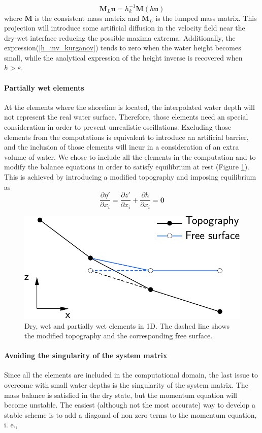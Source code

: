 \documentclass[a4paper,12pt]{elsarticle}
\newcommand{\pder}[2]{\frac{\partial#1}{\partial#2}}
\begin{document}
\begin{equation}
\mathbf{M}_L \mathbf{u} = h^{-1}_k \mathbf{M} (h\mathbf{u})
\end{equation}
where $\mathbf{M}$ is the consistent mass matrix and $\mathbf{M}_L$ is the lumped mass matrix. This projection will introduce some artificial diffusion in the velocity field near the dry-wet interface reducing the possible maxima extrema.
Additionally, the expression(\ref{h_inv_kurganov}) tends to zero when the water height becomes small, while the analytical expression of the height inverse is recovered when $h>\varepsilon$.


\paragraph{Partially wet elements}
At the elements where the shoreline is located, the interpolated water depth will not represent the real water surface.
Therefore, those elements need an special consideration in order to prevent unrealistic oscillations. Excluding those elements from the computations is equivalent to introduce an artificial barrier, and the inclusion of those elements will incur in a consideration of an extra volume of water.
We chose to include all the elements in the computation and to modify the balance equations in order to satisfy equilibrium at rest (Figure \ref{partially_dry}). This is achieved by introducing a modified topography and imposing equilibrium as
\begin{equation}
    \pder{\eta'}{x_i} = \pder{z'}{x_i} + \pder{h}{x_i} = \mathbf{0}
\end{equation}

\begin{figure}
    \centering
    \includegraphics[width=.5\textwidth]{img/fig/partially_dry.pdf}
    \caption{Dry, wet and partially wet elements in 1D. The dashed line shows the modified topography  and the corresponding free surface.}
    \label{partially_dry}
\end{figure}

\paragraph{Avoiding the singularity of the system matrix}
Since all the elements are included in the computational domain, the last issue to overcome with small water depths is the singularity of the system matrix. The mass balance is satisfied in the dry state, but the momentum equation will become unstable. The easiest (although not the most accurate) way to develop a stable scheme is to add a diagonal of non zero terms to the momentum equation, i. e.,
\end{document}
